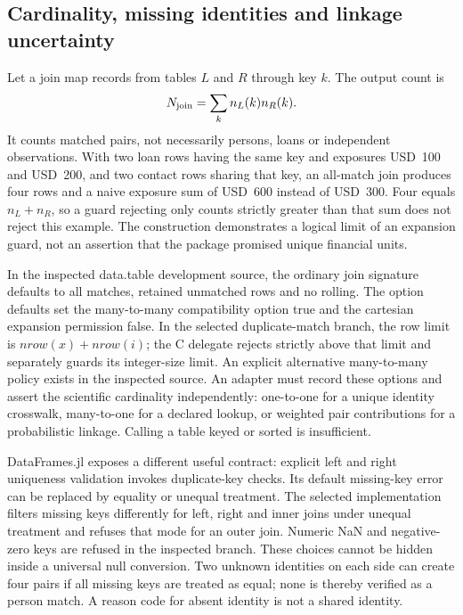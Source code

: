 \subsection{Cardinality, missing identities and linkage uncertainty}

Let a join map records from tables $L$ and $R$ through key $k$. The output count is
\[
 N_{\rm join}=\sum_k n_L(k)n_R(k).
\]
It counts matched pairs, not necessarily persons, loans or independent observations. With two loan rows having the same key and exposures USD~100 and USD~200, and two contact rows sharing that key, an all-match join produces four rows and a naive exposure sum of USD~600 instead of USD~300. Four equals $n_L+n_R$, so a guard rejecting only counts strictly greater than that sum does not reject this example. The construction demonstrates a logical limit of an expansion guard, not an assertion that the package promised unique financial units.~\citep{exec25_dww_choice}

In the inspected data.table development source, the ordinary join signature defaults to all matches, retained unmatched rows and no rolling. The option defaults set the many-to-many compatibility option true and the cartesian expansion permission false. In the selected duplicate-match branch, the row limit is $nrow(x)+nrow(i)$; the C delegate rejects strictly above that limit and separately guards its integer-size limit. An explicit alternative many-to-many policy exists in the inspected source. An adapter must record these options and assert the scientific cardinality independently: one-to-one for a unique identity crosswalk, many-to-one for a declared lookup, or weighted pair contributions for a probabilistic linkage. Calling a table keyed or sorted is insufficient.~\citep{exec25_dww_datatable}

DataFrames.jl exposes a different useful contract: explicit left and right uniqueness validation invokes duplicate-key checks. Its default missing-key error can be replaced by equality or unequal treatment. The selected implementation filters missing keys differently for left, right and inner joins under unequal treatment and refuses that mode for an outer join. Numeric NaN and negative-zero keys are refused in the inspected branch. These choices cannot be hidden inside a universal null conversion. Two unknown identities on each side can create four pairs if all missing keys are treated as equal; none is thereby verified as a person match. A reason code for absent identity is not a shared identity.~\citep{exec25_dww_dataframes,exec25_dww_choice}

